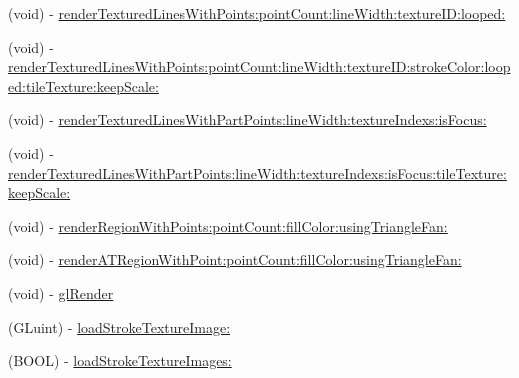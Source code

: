 \begin{DoxyCompactItemize}
\item 
(void) -\/ \hyperlink{interface_b_m_k_overlay_view_a4f1fc6aa6b3dfc3d98469b2221ffabc7}{render\+Textured\+Lines\+With\+Points\+:point\+Count\+:line\+Width\+:texture\+I\+D\+:looped\+:}
\item 
(void) -\/ \hyperlink{interface_b_m_k_overlay_view_ad3355078f88764aa17df4236f2357623}{render\+Textured\+Lines\+With\+Points\+:point\+Count\+:line\+Width\+:texture\+I\+D\+:stroke\+Color\+:looped\+:tile\+Texture\+:keep\+Scale\+:}
\item 
(void) -\/ \hyperlink{interface_b_m_k_overlay_view_adf04cf380e1d2dd2367f559f2552bc85}{render\+Textured\+Lines\+With\+Part\+Points\+:line\+Width\+:texture\+Indexs\+:is\+Focus\+:}
\item 
(void) -\/ \hyperlink{interface_b_m_k_overlay_view_a9259f51ece9695514aab8bab5c982229}{render\+Textured\+Lines\+With\+Part\+Points\+:line\+Width\+:texture\+Indexs\+:is\+Focus\+:tile\+Texture\+:keep\+Scale\+:}
\item 
(void) -\/ \hyperlink{interface_b_m_k_overlay_view_a85a054df49b09373b036e22771138ba2}{render\+Region\+With\+Points\+:point\+Count\+:fill\+Color\+:using\+Triangle\+Fan\+:}
\item 
(void) -\/ \hyperlink{interface_b_m_k_overlay_view_a9b277a3ef5cfef2ba6737af997c869d5}{render\+A\+T\+Region\+With\+Point\+:point\+Count\+:fill\+Color\+:using\+Triangle\+Fan\+:}
\item 
(void) -\/ \hyperlink{interface_b_m_k_overlay_view_a0a851a886a4bb7268ea595d3892ab59f}{gl\+Render}
\item 
(G\+Luint) -\/ \hyperlink{interface_b_m_k_overlay_view_aa6768a6f3648c99f7fde290623be0b24}{load\+Stroke\+Texture\+Image\+:}
\item 
(B\+O\+O\+L) -\/ \hyperlink{interface_b_m_k_overlay_view_a9c3eec3e72dcce4793b8e0f04c48d656}{load\+Stroke\+Texture\+Images\+:}
\end{DoxyCompactItemize}

